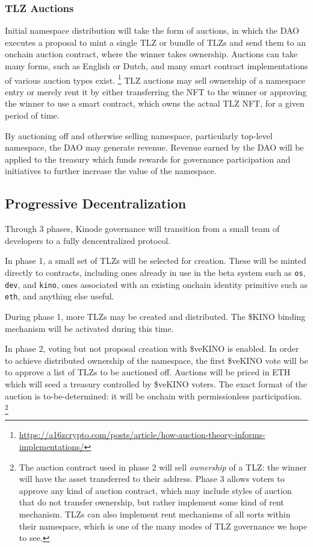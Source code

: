 \documentclass[runningheads]{llncs}
\begin{document}
\subsubsection{TLZ Auctions}
\label{sec:daotldauctions}

Initial namespace distribution will take the form of auctions, in which the DAO executes a proposal to mint a single TLZ or bundle of TLZs and send them to an onchain auction contract, where the winner takes ownership.
Auctions can take many forms, such as English or Dutch, and many smart contract implementations of various auction types exist.
\footnote{\url{https://a16zcrypto.com/posts/article/how-auction-theory-informs-implementations/}}
TLZ auctions may sell ownership of a namespace entry or merely rent it by either transferring the NFT to the winner or approving the winner to use a smart contract, which owns the actual TLZ NFT, for a given period of time.

By auctioning off and otherwise selling namespace, particularly top-level namespace, the DAO may generate revenue.
Revenue earned by the DAO will be applied to the treasury which funds rewards for governance participation and initiatives to further increase the value of the namespace.

\subsection{Progressive Decentralization}
\label{sec:daodecentralization}

Through 3 phases, Kinode governance will transition from a small team of developers to a fully dencentralized protocol.

In phase 1, a small set of TLZs will be selected for creation. These will be minted directly to contracts, including ones already in use in the beta system such as \verb|os|, \verb|dev|, and \verb|kino|, ones associated with an existing onchain identity primitive such as \verb|eth|, and anything else useful.

During phase 1, more TLZs may be created and distributed.
The \$KINO binding mechanism will be activated during this time.

In phase 2, voting but not proposal creation with \$veKINO is enabled.
In order to achieve distributed ownership of the namespace, the first \$veKINO vote will be to approve a list of TLZs to be auctioned off.
Auctions will be priced in ETH which will seed a treasury controlled by \$veKINO voters.
The exact format of the auction is to-be-determined: it will be onchain with permissionless participation.
\footnote{The auction contract used in phase 2 will sell \textit{ownership} of a TLZ: the winner will have the asset transferred to their address.
Phase 3 allows voters to approve any kind of auction contract, which may include styles of auction that do not transfer ownership, but rather implement some kind of rent mechanism.
TLZs can also implement rent mechanisms of all sorts within their namespace, which is one of the many modes of TLZ governance we hope to see.}
\end{document}
